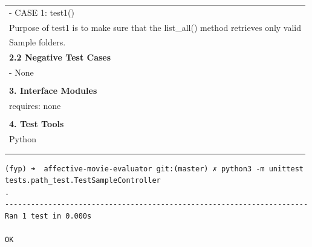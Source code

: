 \documentclass[12pt,a4paper,man]{report}
\begin{document}
\begin{longtable}{|p{7in}|}
\hline
- CASE 1: test1()\\
Purpose of test1 is to make sure that the list\_all() method retrieves only valid\\
Sample folders.\\
\hline
\textbf{2.2 Negative Test Cases}\\
\hline
- None\\
\\
\hline
\textbf{3. Interface Modules}\\
\hline
requires: none\\
\\
\hline
\textbf{4. Test Tools}\\
\hline
Python\\
\\
\\
\hline
\end{longtable}


\begin{verbatim}
(fyp) ➜  affective-movie-evaluator git:(master) ✗ python3 -m unittest tests.path_test.TestSampleController
.
----------------------------------------------------------------------
Ran 1 test in 0.000s

OK
\end{verbatim}
\end{document}
